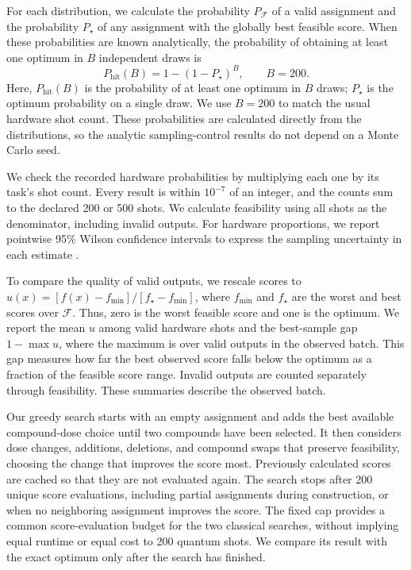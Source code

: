 \documentclass[utf8]{FrontiersinHarvard}
\newcommand{\Fset}{\mathcal{F}}
\begin{document}
For each distribution, we calculate the probability $P_{\Fset}$ of a valid assignment and the probability $P_\star$ of any assignment with the globally best feasible score. When these probabilities are known analytically, the probability of obtaining at least one optimum in $B$ independent draws is
\begin{equation}
 P_{\mathrm{hit}}(B)=1-(1-P_\star)^B,\qquad B=200.
 \label{eq:budget}
\end{equation}
Here, $P_{\mathrm{hit}}(B)$ is the probability of at least one optimum in $B$ draws; $P_\star$ is the optimum probability on a single draw. We use $B=200$ to match the usual hardware shot count. These probabilities are calculated directly from the distributions, so the analytic sampling-control results do not depend on a Monte Carlo seed.

We check the recorded hardware probabilities by multiplying each one by its task's shot count. Every result is within $10^{-7}$ of an integer, and the counts sum to the declared 200 or 500 shots. We calculate feasibility using all shots as the denominator, including invalid outputs. For hardware proportions, we report pointwise 95\% Wilson confidence intervals to express the sampling uncertainty in each estimate \citep{wilson1927}.

To compare the quality of valid outputs, we rescale scores to $u(x)=[f(x)-f_{\min}]/[f_\star-f_{\min}]$, where $f_{\min}$ and $f_\star$ are the worst and best scores over $\Fset$. Thus, zero is the worst feasible score and one is the optimum. We report the mean $u$ among valid hardware shots and the best-sample gap $1-\max u$, where the maximum is over valid outputs in the observed batch. This gap measures how far the best observed score falls below the optimum as a fraction of the feasible score range. Invalid outputs are counted separately through feasibility. These summaries describe the observed batch.

Our greedy search starts with an empty assignment and adds the best available compound-dose choice until two compounds have been selected. It then considers dose changes, additions, deletions, and compound swaps that preserve feasibility, choosing the change that improves the score most. Previously calculated scores are cached so that they are not evaluated again. The search stops after 200 unique score evaluations, including partial assignments during construction, or when no neighboring assignment improves the score. The fixed cap provides a common score-evaluation budget for the two classical searches, without implying equal runtime or equal cost to 200 quantum shots. We compare its result with the exact optimum only after the search has finished.
\end{document}
